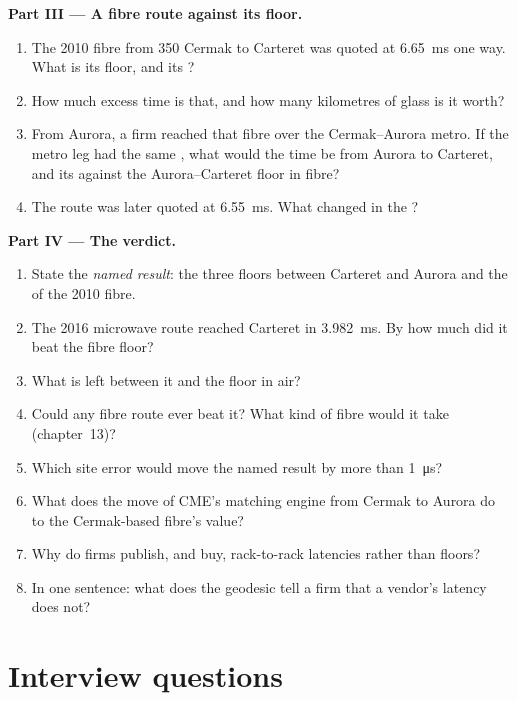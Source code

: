 \begin{problem}
\medskip\noindent\textbf{Part III --- A fibre route against its floor.}
\begin{enumerate}[resume]
\item The 2010 fibre from 350 Cermak to Carteret was quoted at \qty{6.65}{\milli\second} one way. What is its floor, and its ?
\item How much excess time is that, and how many kilometres of glass is it worth?
\item From Aurora, a firm reached that fibre over the Cermak--Aurora metro. If the metro leg had the same , what would the time be
  from Aurora to Carteret, and its  against the Aurora--Carteret floor in fibre?
\item The route was later quoted at \qty{6.55}{\milli\second}. What changed in the ?
\end{enumerate}

\medskip\noindent\textbf{Part IV --- The verdict.}
\begin{enumerate}[resume]
\item State the \emph{named result}: the three floors between Carteret and Aurora and the  of the 2010 fibre.
\item The 2016 microwave route reached Carteret in \qty{3.982}{\milli\second}. By how much did it beat the fibre floor?
\item What is left between it and the floor in air?
\item Could any fibre route ever beat it? What kind of fibre would it take (chapter~13)?
\item Which site error would move the named result by more than \qty{1}{\micro\second}?
\item What does the move of CME's matching engine from Cermak to Aurora do to the Cermak-based fibre's value?
\item Why do firms publish, and buy, rack-to-rack latencies rather than floors?
\item In one sentence: what does the geodesic tell a firm that a vendor's latency does not?
\end{enumerate}
\end{problem}

\section{Interview questions}

